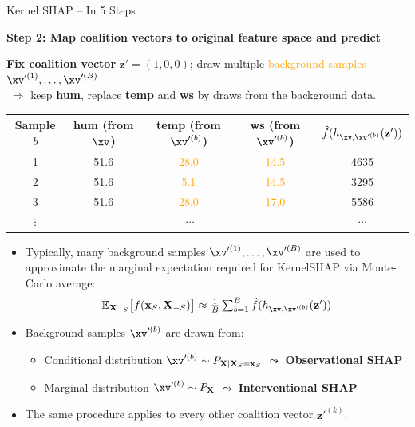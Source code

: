 \documentclass[11pt,compress,t,notes=noshow, aspectratio=169, xcolor=table]{beamer}
\begin{document}
\begin{frame}{Kernel SHAP – In 5 Steps}

\textbf{Step 2: Map coalition vectors to original feature space and predict}

\medskip

\textbf{Fix coalition vector} \(\mathbf{z}'=(1,0,0)\); draw multiple \textcolor{orange}{background samples $\xv'^{(1)}, \dots, \xv'^{(B)}$}\\
\(\;\Rightarrow\) keep \textbf{hum}, replace \textbf{temp} and \textbf{ws} by draws from the background data.

\begin{table}\centering\small
\begin{tabular}{c|ccc|c}
Sample \(b\) & hum (from \(\xv\)) & temp (from $\xv'^{(b)}$) & ws (from $\xv'^{(b)}$)  & \(\hat{f}(h_{\xv, \xv'^{(b)}}(\mathbf{z}'))\) \\
\hline
1 & 51.6 & \textcolor{orange}{28.0} & \textcolor{orange}{14.5} & 4635 \\
2 & 51.6 & \textcolor{orange}{5.1} & \textcolor{orange}{14.5} & 3295 \\
3 & 51.6 & \textcolor{orange}{28.0} & \textcolor{orange}{17.0} & 5586 \\
$\vdots$ & \multicolumn{3}{c}{$\cdots$} & $\cdots$ \\
\end{tabular}
\end{table}


\begin{itemize}
  \item Typically, many background samples $\xv'^{(1)}, \dots, \xv'^{(B)}$ are used to approximate the marginal expectation required for KernelSHAP via Monte-Carlo average:
  $$ \textstyle \mathbb{E}_{\mathbf{X}_{-S}}\bigl[f(\mathbf{x}_S,\mathbf{X}_{-S})\bigr] \approx
\frac{1}{B}\sum_{b=1}^{B}\hat{f}(h_{\xv, \xv'^{(b)}}(\mathbf{z}'))$$
\item Background samples \( \xv'^{(b)} \) are drawn from:
\begin{itemize}
  \item Conditional distribution \( \xv'^{(b)} \sim P_{\mathbf{X} \mid \mathbf{X}_S = \mathbf{x}_S} \) $\leadsto$ \textbf{Observational SHAP} 
  \item Marginal distribution \( \xv'^{(b)} \sim P_{\mathbf{X}} \) $\leadsto$  \textbf{Interventional SHAP}
\end{itemize}

\item The same procedure applies to every other coalition vector \(\mathbf{z}'^{(k)}\).
\end{itemize}

\end{frame}
\end{document}
